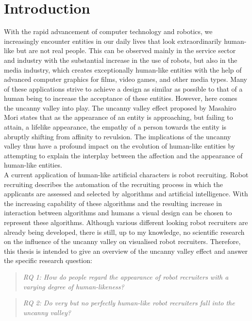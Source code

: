 \chapter{Introduction}
With the rapid advancement of computer technology and robotics, we increasingly encounter entities in our daily lives that look extraordinarily human-like but are not real people. This can be observed mainly in the service sector and industry with the substantial increase in the use of robots, but also in the media industry, which creates exceptionally human-like entities with the help of advanced computer graphics for films, video games, and other media types. Many of these applications strive to achieve a design as similar as possible to that of a human being to increase the acceptance of these entities. However, here comes the uncanny valley into play. The uncanny valley effect proposed by Masahiro Mori \cite{original_masahiro} states that as the appearance of an entity is approaching, but failing to attain, a lifelike appearance, the empathy of a person towards the entity is abruptly shifting from affinity to revulsion. The implications of the uncanny valley thus have a profound impact on the evolution of human-like entities by attempting to explain the interplay between the affection and the appearance of human-like entities.\\
A current application of human-like artificial characters is robot recruiting. Robot recruiting describes the automation of the recruiting process in which the applicants are assessed and selected by algorithms and artificial intelligence. With the increasing capability of these algorithms and the resulting increase in interaction between algorithms and humans a visual design can be chosen to represent these algorithms.
Although various different looking robot recruiters are already being developed, there is still, up to my knowledge, no scientific research on the influence of the uncanny valley on visualised robot recruiters.\newpage
Therefore, this thesis is intended to give an overview of the uncanny valley effect and answer the specific research question:

\begin{quote}\emph{RQ 1: How do people regard the appearance of robot recruiters with a varying degree of human-likeness?}\end{quote} 

\begin{quote}\emph{RQ 2: Do very but no perfectly human-like robot recruiters fall into the uncanny valley?}\end{quote} 

